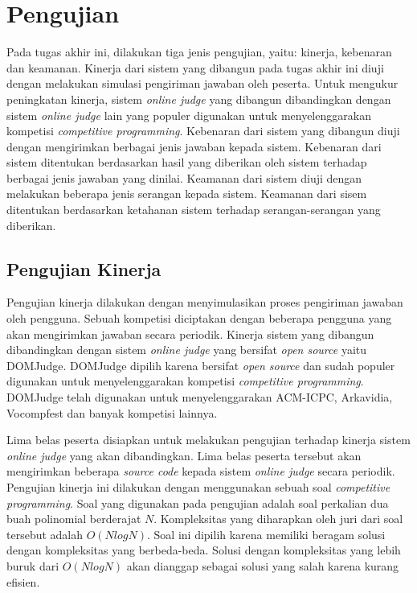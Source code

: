 \section{Pengujian}

\par Pada tugas akhir ini, dilakukan tiga jenis pengujian, yaitu: kinerja, kebenaran dan keamanan. Kinerja dari sistem yang dibangun pada tugas akhir ini diuji dengan melakukan simulasi pengiriman jawaban oleh peserta. Untuk mengukur peningkatan kinerja, sistem \textit{online judge} yang dibangun dibandingkan dengan sistem \textit{online judge} lain yang populer digunakan untuk menyelenggarakan kompetisi \textit{competitive programming}. Kebenaran dari sistem yang dibangun diuji dengan mengirimkan berbagai jenis jawaban kepada sistem. Kebenaran dari sistem ditentukan berdasarkan hasil yang diberikan oleh sistem terhadap berbagai jenis jawaban yang dinilai. Keamanan dari sistem diuji dengan melakukan beberapa jenis serangan kepada sistem. Keamanan dari sisem ditentukan berdasarkan ketahanan sistem terhadap serangan-serangan yang diberikan.

\subsection{Pengujian Kinerja}

\par Pengujian kinerja dilakukan dengan menyimulasikan proses pengiriman jawaban oleh pengguna. Sebuah kompetisi diciptakan dengan beberapa pengguna yang akan mengirimkan jawaban secara periodik. Kinerja sistem yang dibangun dibandingkan dengan sistem \textit{online judge} yang bersifat \textit{open source} yaitu DOMJudge. DOMJudge dipilih karena bersifat \textit{open source} dan sudah populer digunakan untuk menyelenggarakan kompetisi \textit{competitive programming}. DOMJudge telah digunakan untuk menyelenggarakan ACM-ICPC, Arkavidia, Vocompfest dan banyak kompetisi lainnya.

\par Lima belas peserta disiapkan untuk melakukan pengujian terhadap kinerja sistem \textit{online judge} yang akan dibandingkan. Lima belas peserta tersebut akan mengirimkan beberapa \textit{source code} kepada sistem \textit{online judge} secara periodik. Pengujian kinerja ini dilakukan dengan menggunakan sebuah soal \textit{competitive programming}. Soal yang digunakan pada pengujian adalah soal perkalian dua buah polinomial berderajat $N$. Kompleksitas yang diharapkan oleh juri dari soal tersebut adalah $O(N log N)$. Soal ini dipilih karena memiliki beragam solusi dengan kompleksitas yang berbeda-beda. Solusi dengan kompleksitas yang lebih buruk dari $O(N log N)$ akan dianggap sebagai solusi yang salah karena kurang efisien.

